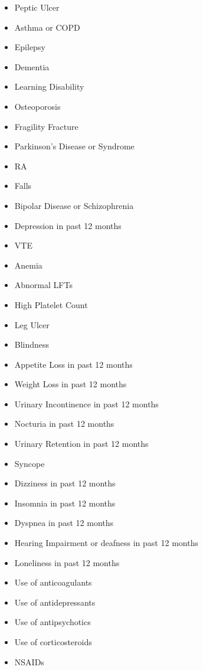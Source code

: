 \documentclass[a4paper,12pt]{article}
\begin{document}
\begin{appendices}
\begin{itemize}
\begin{itemize}
	   			\item Peptic Ulcer
	   			\item Asthma or COPD
	   			\item Epilepsy
	   			\item Dementia
	   			\item Learning Disability
	   			\item Osteoporosis
	   			\item Fragility Fracture
	   			\item Parkinson's Disease or Syndrome
	   			\item RA
	   			\item Falls
	   			\item Bipolar Disease or Schizophrenia
	   			\item Depression in past 12 months
	   			\item VTE
	   			\item Anemia
	   			\item Abnormal LFTs
	   			\item High Platelet Count
	   			\item Leg Ulcer
	   			\item Blindness
	   			\item Appetite Loss in past 12 months
	   			\item Weight Loss in past 12 months
	   			\item Urinary Incontinence in past 12 months
	   			\item Nocturia in past 12 months
	   			\item Urinary Retention in past 12 months
	   			\item Syncope
	   			\item Dizziness in past 12 months
	   			\item Insomnia in past 12 months
	   			\item Dyspnea in past 12 months
	   			\item Hearing Impairment or deafness in past 12 months
	   			\item Loneliness in past 12 months
	   			\item Use of anticoagulants
	   			\item Use of antidepressants
	   			\item Use of antipsychotics
	   			\item Use of corticosteroids
	   			\item NSAIDs
	   		\end{itemize}
   		\end{itemize}
   		\newpage
   		

\end{appendices}
\end{document}
